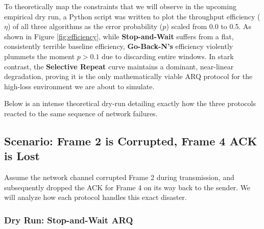 \documentclass[12pt, a4paper]{article}
\begin{document}
To theoretically map the constraints that we will observe in the upcoming empirical dry run, a Python script was written to plot the throughput efficiency ($\eta$) of all three algorithms as the error probability ($p$) scaled from 0.0 to 0.5. As shown in Figure \ref{fig:efficiency}, while \textbf{Stop-and-Wait} suffers from a flat, consistently terrible baseline efficiency, \textbf{Go-Back-N's} efficiency violently plummets the moment $p > 0.1$ due to discarding entire windows. In stark contrast, the \textbf{Selective Repeat} curve maintains a dominant, near-linear degradation, proving it is the only mathematically viable ARQ protocol for the high-loss environment we are about to simulate.

Below is an intense theoretical dry-run detailing exactly how the three protocols reacted to the same sequence of network failures.

\subsection{Scenario: Frame 2 is Corrupted, Frame 4 ACK is Lost}
Assume the network channel corrupted Frame 2 during transmission, and subsequently dropped the ACK for Frame 4 on its way back to the sender. We will analyze how each protocol handles this exact disaster.

\subsubsection{Dry Run: Stop-and-Wait ARQ}
\end{document}

